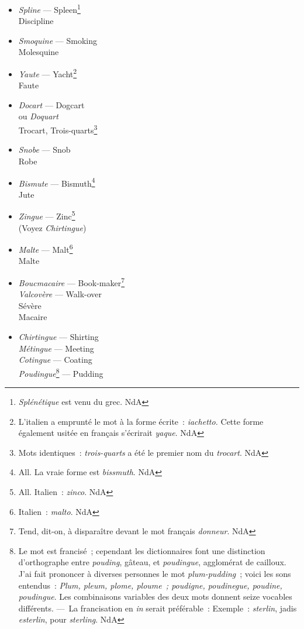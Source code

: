 \documentclass[french,twoside]{book} %
\begin{document}
\begin{itemize}[itemsep=0pt,]
Doume\footnote{ Sorte de palmier. NdA}
\item {\itshape Spline} — Spleen\footnote{ {\itshape Splénétique} est venu du grec. NdA} \\
Discipline
\item {\itshape Smoquine} — Smoking \\
Molesquine
\item {\itshape Yaute} — Yacht\footnote{ L’italien a emprunté le mot à la forme écrite : {\itshape iachetto.} Cette forme également usitée en français s’écrirait {\itshape yaque}. NdA} \\
Faute
\item {\itshape Docart} — Dogcart \\
ou {\itshape Doquart} \\
Trocart, Trois-quarts\footnote{ Mots identiques : {\itshape trois-quarts} a été le premier nom du {\itshape trocart}. NdA}
\item {\itshape Snobe} — Snob \\
Robe
\item {\itshape Bismute} — Bismuth\footnote{ All. La vraie forme est {\itshape bissmuth}. NdA} \\
Jute
\item {\itshape Zingue} — Zinc\footnote{ All. Italien : {\itshape zinco}. NdA} \\
(Voyez {\itshape Chirtingue})
\item {\itshape Malte} — Malt\footnote{ Italien : {\itshape malto}. NdA} \\
Malte
\item {\itshape Boucmacaire} — Book-maker\footnote{ Tend, dit-on, à disparaître devant le mot français {\itshape donneur}. NdA} \\
{\itshape Valcovère} — Walk-over \\
Sévère \\
Macaire
\item {\itshape Chirtingue} — Shirting \\
{\itshape Métingue} — Meeting \\
{\itshape Cotingue} — Coating \\
{\itshape Poudingue}\footnote{ Le mot est francisé ; cependant les dictionnaires font une distinction d’orthographe entre {\itshape pouding}, gâteau, et {\itshape poudingue}, agglomérat de cailloux. J’ai fait prononcer à diverses personnes le mot {\itshape plum-pudding} ; voici les sons entendus : {\itshape Plum, pleum, plome, ploume ; poudigne, poudinegue, poudine, poudingue}. Les combinaisons variables des deux mots donnent seize vocables différents. — La francisation en {\itshape in} serait préférable : Exemple : {\itshape sterlin}, jadis {\itshape esterlin}, pour {\itshape sterling}. NdA} — Pudding 

\end{itemize}
\end{document}
